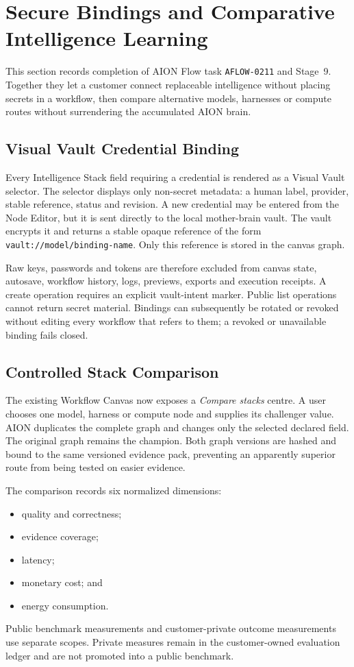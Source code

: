 \section{Secure Bindings and Comparative Intelligence Learning}
\label{sec:aion-flow-secure-bindings-comparison}

This section records completion of AION Flow task \texttt{AFLOW-0211} and
Stage~9.  Together they let a customer connect replaceable intelligence without
placing secrets in a workflow, then compare alternative models, harnesses or
compute routes without surrendering the accumulated AION brain.

\subsection{Visual Vault Credential Binding}

Every Intelligence Stack field requiring a credential is rendered as a Visual
Vault selector.  The selector displays only non-secret metadata: a human label,
provider, stable reference, status and revision.  A new credential may be
entered from the Node Editor, but it is sent directly to the local mother-brain
vault.  The vault encrypts it and returns a stable opaque reference of the form
\texttt{vault://model/binding-name}.  Only this reference is stored in the
canvas graph.

Raw keys, passwords and tokens are therefore excluded from canvas state,
autosave, workflow history, logs, previews, exports and execution receipts.  A
create operation requires an explicit vault-intent marker.  Public list
operations cannot return secret material.  Bindings can subsequently be
rotated or revoked without editing every workflow that refers to them; a
revoked or unavailable binding fails closed.

\subsection{Controlled Stack Comparison}

The existing Workflow Canvas now exposes a \emph{Compare stacks} centre.  A
user chooses one model, harness or compute node and supplies its challenger
value.  AION duplicates the complete graph and changes only the selected
declared field.  The original graph remains the champion.  Both graph versions
are hashed and bound to the same versioned evidence pack, preventing an
apparently superior route from being tested on easier evidence.

The comparison records six normalized dimensions:
\begin{itemize}
  \item quality and correctness;
  \item evidence coverage;
  \item latency;
  \item monetary cost; and
  \item energy consumption.
\end{itemize}
Public benchmark measurements and customer-private outcome measurements use
separate scopes.  Private measures remain in the customer-owned evaluation
ledger and are not promoted into a public benchmark.


